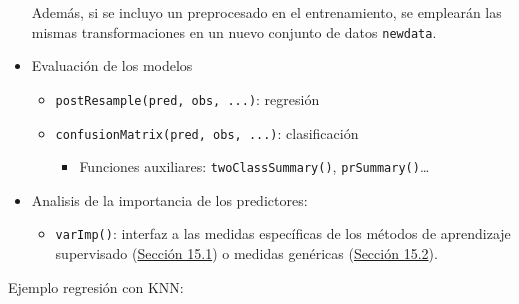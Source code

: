\documentclass[
]{book}
\providecommand{\tightlist}{%
  \setlength{\itemsep}{0pt}\setlength{\parskip}{0pt}}
\theoremstyle{break}
\theoremstyle{definition}
\theoremstyle{definition}
\theoremstyle{definition}
\theoremstyle{remark}
\begin{document}
\begin{itemize}
  Además, si se incluyo un preprocesado en el entrenamiento, se emplearán las mismas transformaciones en un nuevo conjunto de datos \texttt{newdata}.
\item
  Evaluación de los modelos

  \begin{itemize}
  \item
    \texttt{postResample(pred,\ obs,\ ...)}: regresión
  \item
    \texttt{confusionMatrix(pred,\ obs,\ ...)}: clasificación

    \begin{itemize}
    \tightlist
    \item
      Funciones auxiliares: \texttt{twoClassSummary()}, \texttt{prSummary()}\ldots{}
    \end{itemize}
  \end{itemize}
\item
  Analisis de la importancia de los predictores:

  \begin{itemize}
  \tightlist
  \item
    \texttt{varImp()}: interfaz a las medidas específicas de los métodos de aprendizaje supervisado (\href{https://topepo.github.io/caret/variable-importance.html\#model-specific-metrics}{Sección 15.1}) o medidas genéricas (\href{https://topepo.github.io/caret/variable-importance.html\#model-independent-metrics}{Sección 15.2}).
  \end{itemize}
\end{itemize}

Ejemplo regresión con KNN:
\end{document}

